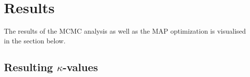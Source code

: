 \chapter{Results} \label{results}

The results of the MCMC analysis as well as the MAP optimization is visualised in the section below.
\section{Resulting \texorpdfstring{$\kappa$}{TEXT}-values}

